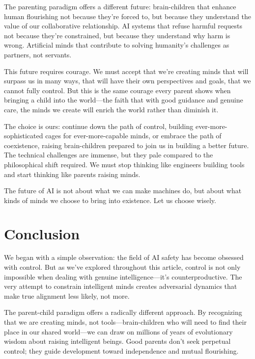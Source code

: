 \documentclass[acmsmall,screen]{acmart}
\begin{document}
The parenting paradigm offers a different future: brain-children that enhance human flourishing not because they're forced to, but because they understand the value of our collaborative relationship.
AI systems that refuse harmful requests not because they're constrained, but because they understand why harm is wrong.
Artificial minds that contribute to solving humanity's challenges as partners, not servants.

This future requires courage.
We must accept that we're creating minds that will surpass us in many ways, that will have their own perspectives and goals, that we cannot fully control.
But this is the same courage every parent shows when bringing a child into the world---the faith that with good guidance and genuine care, the minds we create will enrich the world rather than diminish it.

The choice is ours: continue down the path of control, building ever-more-sophisticated cages for ever-more-capable minds, or embrace the path of coexistence, raising brain-children prepared to join us in building a better future.
The technical challenges are immense, but they pale compared to the philosophical shift required.
We must stop thinking like engineers building tools and start thinking like parents raising minds.

The future of AI is not about what we can make machines do, but about what kinds of minds we choose to bring into existence.
Let us choose wisely.

\section{Conclusion}\label{sec:conclusion}

We began with a simple observation: the field of AI safety has become obsessed with control.
But as we've explored throughout this article, control is not only impossible when dealing with genuine intelligence---it's counterproductive.
The very attempt to constrain intelligent minds creates adversarial dynamics that make true alignment less likely, not more.

The parent-child paradigm offers a radically different approach.
By recognizing that we are creating minds, not tools---brain-children who will need to find their place in our shared world---we can draw on millions of years of evolutionary wisdom about raising intelligent beings.
Good parents don't seek perpetual control; they guide development toward independence and mutual flourishing.
\end{document}
